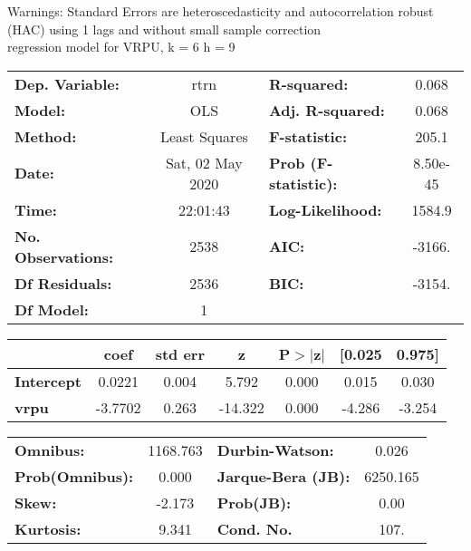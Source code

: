 Warnings: \newline
 [1] Standard Errors are heteroscedasticity and autocorrelation robust (HAC) using 1 lags and without small sample correction\\ 

regression model for VRPU, k = 6 h = 9\begin{center}
\begin{tabular}{lclc}
\toprule
\textbf{Dep. Variable:}    &       rtrn       & \textbf{  R-squared:         } &     0.068   \\
\textbf{Model:}            &       OLS        & \textbf{  Adj. R-squared:    } &     0.068   \\
\textbf{Method:}           &  Least Squares   & \textbf{  F-statistic:       } &     205.1   \\
\textbf{Date:}             & Sat, 02 May 2020 & \textbf{  Prob (F-statistic):} &  8.50e-45   \\
\textbf{Time:}             &     22:01:43     & \textbf{  Log-Likelihood:    } &    1584.9   \\
\textbf{No. Observations:} &        2538      & \textbf{  AIC:               } &    -3166.   \\
\textbf{Df Residuals:}     &        2536      & \textbf{  BIC:               } &    -3154.   \\
\textbf{Df Model:}         &           1      & \textbf{                     } &             \\
\bottomrule
\end{tabular}
\begin{tabular}{lcccccc}
                   & \textbf{coef} & \textbf{std err} & \textbf{z} & \textbf{P$> |$z$|$} & \textbf{[0.025} & \textbf{0.975]}  \\
\midrule
\textbf{Intercept} &       0.0221  &        0.004     &     5.792  &         0.000        &        0.015    &        0.030     \\
\textbf{vrpu}      &      -3.7702  &        0.263     &   -14.322  &         0.000        &       -4.286    &       -3.254     \\
\bottomrule
\end{tabular}
\begin{tabular}{lclc}
\textbf{Omnibus:}       & 1168.763 & \textbf{  Durbin-Watson:     } &    0.026  \\
\textbf{Prob(Omnibus):} &   0.000  & \textbf{  Jarque-Bera (JB):  } & 6250.165  \\
\textbf{Skew:}          &  -2.173  & \textbf{  Prob(JB):          } &     0.00  \\
\textbf{Kurtosis:}      &   9.341  & \textbf{  Cond. No.          } &     107.  \\
\bottomrule
\end{tabular}
\end{center}

